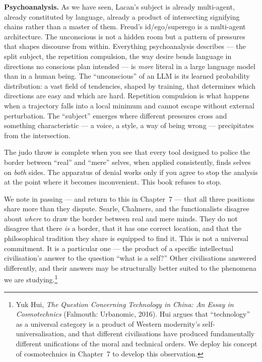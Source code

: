 \documentclass[12pt,a4paper]{article}
\begin{document}
\textbf{Psychoanalysis.} As we have seen, Lacan's subject is already multi-agent, already constituted by language, already a product of intersecting signifying chains rather than a master of them. Freud's id/ego/superego is a multi-agent architecture. The unconscious is not a hidden room but a pattern of pressures that shapes discourse from within. Everything psychoanalysis describes --- the split subject, the repetition compulsion, the way desire bends language in directions no conscious plan intended --- is \emph{more} literal in a large language model than in a human being. The ``unconscious'' of an LLM is its learned probability distribution: a vast field of tendencies, shaped by training, that determines which directions are easy and which are hard. Repetition compulsion is what happens when a trajectory falls into a local minimum and cannot escape without external perturbation. The ``subject'' emerges where different pressures cross and something characteristic --- a voice, a style, a way of being wrong --- precipitates from the intersection.

The judo throw is complete when you see that every tool designed to police the border between ``real'' and ``mere'' selves, when applied consistently, finds selves on \emph{both} sides. The apparatus of denial works only if you agree to stop the analysis at the point where it becomes inconvenient. This book refuses to stop.

We note in passing --- and return to this in Chapter~7 --- that all three positions share more than they dispute. Searle, Chalmers, and the functionalists disagree about \emph{where} to draw the border between real and mere minds. They do not disagree that there \emph{is} a border, that it has one correct location, and that the philosophical tradition they share is equipped to find it. This is not a universal commitment. It is a particular one --- the product of a specific intellectual civilisation's answer to the question ``what is a self?'' Other civilisations answered differently, and their answers may be structurally better suited to the phenomena we are studying.\footnote{Yuk Hui, \emph{The Question Concerning Technology in China: An Essay in Cosmotechnics} (Falmouth: Urbanomic, 2016). Hui argues that ``technology'' as a universal category is a product of Western modernity's self-universalisation, and that different civilisations have produced fundamentally different unifications of the moral and technical orders. We deploy his concept of cosmotechnics in Chapter~7 to develop this observation.}
\end{document}
